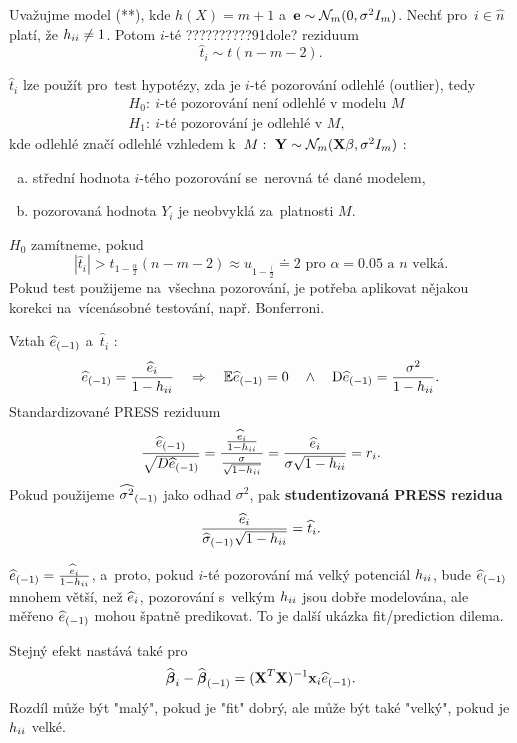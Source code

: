 \begin{corollary}
	Uvažujme model (**), kde $h(X) = m+1$ a~$\mathbf{e}\sim\mathcal{N}_m(0,\sigma^2 I_m)$. Nechť pro~$i\in\widehat{n}$ platí, že $h_{ii}\neq1$. Potom $i$-té ??????????91dole? reziduum
	 $$ \widehat{t}_i\sim t(n-m-2). $$
\end{corollary}
\begin{remark}
	 $\widehat{t}_i$ lze použít pro~test hypotézy, zda je $i$-té pozorování odlehlé (outlier), tedy
	\[
	\begin{split}
	&H_0:~i\text{-té pozorování není odlehlé v~modelu }M\\
	&H_1:~i\text{-té pozorování je odlehlé v~}M,
	\end{split}
	\] kde odlehlé značí odlehlé vzhledem k~$M:~\mathbf{Y}\sim\mathcal{N}_m(\textbf{X}\beta,\sigma^2 I_m)$ :\begin{enumerate}[a)]
		\item střední hodnota $i$-tého pozorování se~nerovná té dané modelem,
		\item pozorovaná hodnota $Y_i$ je neobvyklá za~platnosti $M$.
	\end{enumerate}
 $H_0$ zamítneme, pokud $$ |\widehat{t}_i|>t_{1-\frac{\alpha}{2}}(n-m-2)\approx u_{1-\frac{\lparen}{2}}\doteq 2\text{ pro~}\alpha = 0.05\text{ a~}n\text{ velká}. $$
Pokud test použijeme na~všechna pozorování, je potřeba aplikovat nějakou korekci na~vícenásobné testování, např. Bonferroni.
\end{remark}
\begin{remark}
	Vztah ${\widehat{e}_{(-1)}}$ a~$\widehat{t}_i$ :
	 $$ {\widehat{e}_{(-1)}} = \frac{\widehat{e}_i}{1-h_{ii}}\quad\Rightarrow\quad\mathbb{E}{\widehat{e}_{(-1)}} = 0\quad\wedge\quad \mathrm{D} {\widehat{e}_{(-1)}} = \frac{\sigma^2}{1-h_{ii}}. $$
	Standardizované PRESS reziduum $$ \frac{{\widehat{e}_{(-1)}}}{\sqrt{D{\widehat{e}_{(-1)}}}} = \frac{\frac{\widehat{e}_i}{1-h_{ii}}}{\frac{\sigma}{\sqrt{1-h_{ii}}}} = \frac{\widehat{e}_i}{\sigma\sqrt{1-h_{ii}}} = r_i. $$
	Pokud použijeme ${\widehat{{\sigma}^2}_{(-1)}}$ jako odhad $\sigma^2$, pak \textbf{studentizovaná PRESS rezidua} $$ \frac{\widehat{e}_i}{{\widehat{{\sigma}}_{(-1)}}\sqrt{1-h_{ii}}} = \widehat{t}_i. $$
\end{remark}
\begin{remark}
	 ${\widehat{e}_{(-1)}} = \frac{\widehat{e}_i}{1-h_{ii}}$, a~proto, pokud $i$-té pozorování má velký potenciál $h_{ii}$, bude ${\widehat{e}_{(-1)}}$ mnohem větší, než $\widehat{e}_i$, pozorování s~velkým $h_{ii}$ jsou dobře modelována, ale měřeno ${\widehat{e}_{(-1)}}$ mohou špatně predikovat. To je další ukázka fit/prediction dilema.
	
	Stejný efekt nastává také pro~
	 $$ \widehat{\boldsymbol{\beta}}_i-{\widehat{\boldsymbol{\beta}}_{(-1)}} = {(\textbf{X}^T\textbf{X})^{-1}}\mathbf{x}_i{\widehat{e}_{(-1)}}. $$
	Rozdíl může být "malý", pokud je "fit" dobrý, ale může být také "velký", pokud je $h_{ii}$ velké.
\end{remark}

